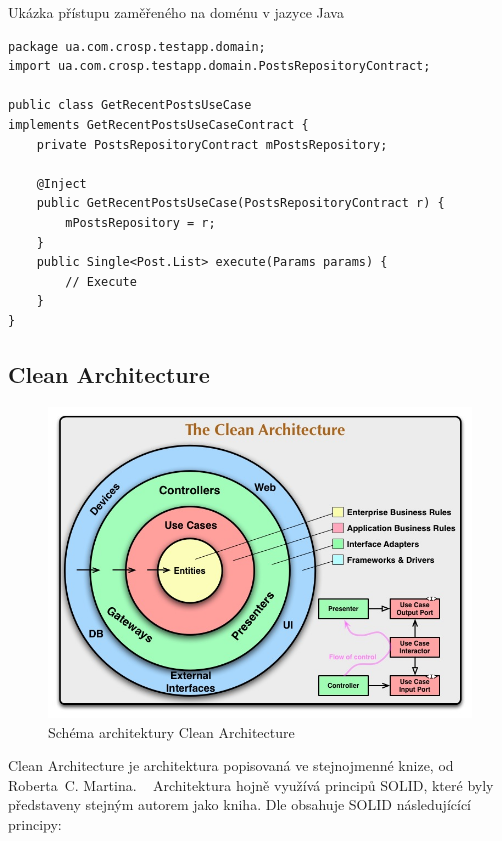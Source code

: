 \begin{listing}
    \caption{Ukázka přístupu zaměřeného na doménu v jazyce Java~\cite{architecture}}
    \label{code:architecture-domain}
    \begin{verbatim}
package ua.com.crosp.testapp.domain;
import ua.com.crosp.testapp.domain.PostsRepositoryContract;

public class GetRecentPostsUseCase
implements GetRecentPostsUseCaseContract {
    private PostsRepositoryContract mPostsRepository;

    @Inject
    public GetRecentPostsUseCase(PostsRepositoryContract r) {
        mPostsRepository = r;
    }
    public Single<Post.List> execute(Params params) {
        // Execute
    }
}
    \end{verbatim}
\end{listing}

\subsection{Clean Architecture}

\begin{figure}
    \centering
    \includegraphics[width=\linewidth]{assets/technology-research/architecture/clean-architecture.jpg}
    \caption{Schéma architektury
    Clean Architecture~\cite{the_clean_architecture}}
    \label{fig:the_clean_architecture}
\end{figure}

Clean Architecture je architektura popisovaná ve stejnojmenné knize,
od Roberta~C. Martina.
~\cite[část 3]{martin_clean_architecture}
Architektura hojně využívá principů SOLID,
které byly představeny stejným autorem jako kniha.
Dle \cite[část 3]{martin_clean_architecture} obsahuje SOLID následujícící principy:


